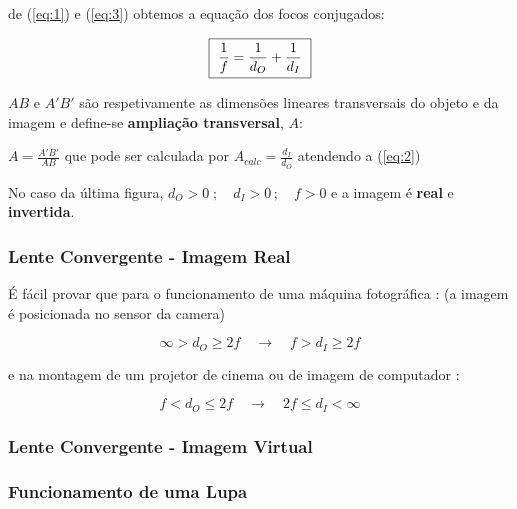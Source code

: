 \documentclass[a4paper,12pt]{article}      %
\begin{document}
de (\ref{eq:1}) e (\ref{eq:3}) obtemos a equação dos focos conjugados:
 
 \begin{equation}
	\label{eq:focosconjug}
    \fbox{
        $ \displaystyle
	\frac{1}{f} = \frac{1}{d_O} +\frac{1}{d_I} 
        $
    }
\end{equation}



$AB$ e $A'B'$ são respetivamente as dimensões lineares transversais do objeto e da imagem  e define-se \textbf{ampliação transversal}, $A$:

$A =  \frac{A'B'}{ AB} $ que pode ser calculada por $A_{calc}=\frac{d_I}{d_O} $ atendendo a (\ref{eq:2})

No caso da última figura, $d_O > 0\;; \quad d_I > 0\,; \quad f > 0$ e a imagem é \textbf{real} e \textbf{invertida}.

\subsubsection{\sf Lente Convergente -  Imagem Real}
É fácil provar que para o funcionamento de uma máquina fotográfica  :
(a imagem é posicionada no sensor da camera)

\begin{equation}
\infty > d_O \ge 2 f \quad \to \quad f > d_I \ge 2 f  
\end{equation}

e na montagem de um projetor de cinema ou de imagem de computador  :

\begin{equation}
f < d_O \le 2 f  \quad \to  \quad  2 f \le d_I < \infty 
\end{equation}

\subsubsection{\sf Lente Convergente - Imagem Virtual}

\subsubsection{\sf Funcionamento de uma Lupa}
\end{document}
